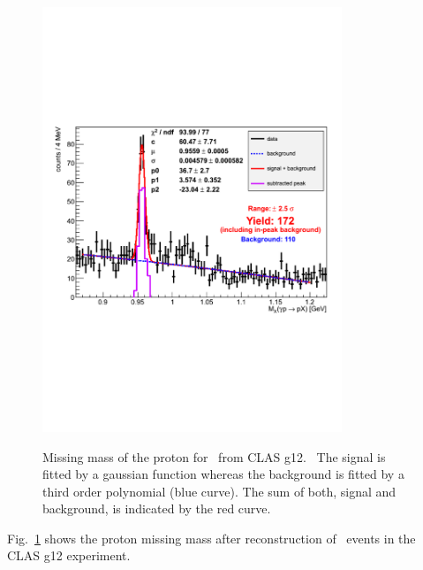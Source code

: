 \begin{figure}[h!]\begin{center}
  \includegraphics[width=0.8\textwidth]{etaPeeg_mimass.pdf}
  \label{fig:g12MxP}
  \caption[Counts rates for \etaTP from g12]{Missing mass of the proton for \etaPDal \  from CLAS g12.~\cite{thesisschever} The signal is fitted by a gaussian function whereas the background is fitted by a third order polynomial (blue curve). The sum of both, signal and background, is indicated by the red curve.}
\end{center}\end{figure}

Fig.~\ref{fig:g12MxP} shows the proton missing mass after reconstruction of  \etaPDal \  events in the CLAS g12 experiment.
 
